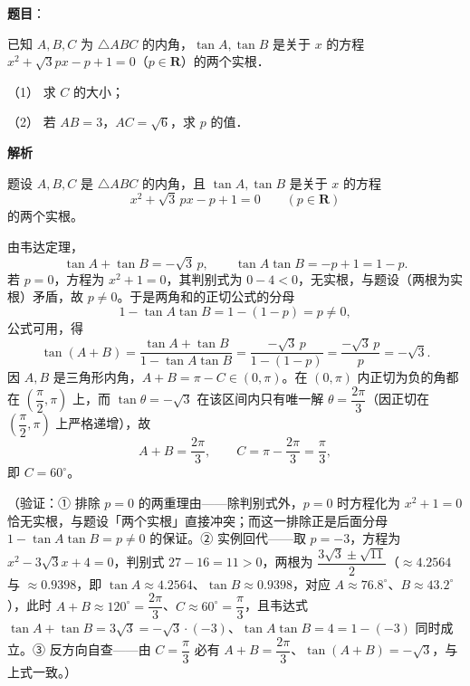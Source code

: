\begin{answer}

\textbf{题目}：

已知 \(A,B,C\) 为 \(\triangle ABC\) 的内角，\(\tan A,\tan B\) 是关于 \(x\) 的方程 \(x^2+\sqrt{3}px-p+1=0\)（\(p\in\mathbf{R}\)）的两个实根．

（1） 求 \(C\) 的大小；

（2） 若 \(AB=3\)，\(AC=\sqrt{6}\)，求 \(p\) 的值．

\textbf{解析}

题设 \(A,B,C\) 是 \(\triangle ABC\) 的内角，且 \(\tan A,\tan B\) 是关于 \(x\) 的方程
\nopagebreak[4]
\[
x^{2}+\sqrt{3}\,px-p+1=0\qquad(p\in\mathbf{R})
\]
的两个实根。


由韦达定理，
\nopagebreak[4]
\[
\tan A+\tan B=-\sqrt{3}\,p,\qquad \tan A\tan B=-p+1=1-p .
\]
若 \(p=0\)，方程为 \(x^{2}+1=0\)，其判别式为 \(0-4<0\)，无实根，与题设（两根为实根）矛盾，故 \(p\neq0\)。于是两角和的正切公式的分母
\nopagebreak[4]
\[
1-\tan A\tan B=1-(1-p)=p\neq0,
\]
公式可用，得
\nopagebreak[4]
\[
\tan(A+B)=\frac{\tan A+\tan B}{1-\tan A\tan B}=\frac{-\sqrt{3}\,p}{1-(1-p)}=\frac{-\sqrt{3}\,p}{p}=-\sqrt{3}.
\]
因 \(A,B\) 是三角形内角，\(A+B=\pi-C\in(0,\pi)\)。在 \((0,\pi)\) 内正切为负的角都在 \(\left(\dfrac{\pi}{2},\pi\right)\) 上，而 \(\tan\theta=-\sqrt{3}\) 在该区间内只有唯一解 \(\theta=\dfrac{2\pi}{3}\)（因正切在 \(\left(\dfrac{\pi}{2},\pi\right)\) 上严格递增），故
\nopagebreak[4]
\[
A+B=\frac{2\pi}{3},\qquad C=\pi-\frac{2\pi}{3}=\frac{\pi}{3},
\]
即 \(C=60^{\circ}\)。

（验证：① 排除 \(p=0\) 的两重理由——除判别式外，\(p=0\) 时方程化为 \(x^{2}+1=0\) 恰无实根，与题设「两个实根」直接冲突；而这一排除正是后面分母 \(1-\tan A\tan B=p\neq0\) 的保证。② 实例回代——取 \(p=-3\)，方程为 \(x^{2}-3\sqrt{3}x+4=0\)，判别式 \(27-16=11>0\)，两根为 \(\dfrac{3\sqrt{3}\pm\sqrt{11}}{2}\)（\(\approx4.2564\) 与 \(\approx0.9398\)，即 \(\tan A\approx4.2564\)、\(\tan B\approx0.9398\)，对应 \(A\approx76.8^{\circ}\)、\(B\approx43.2^{\circ}\)），此时 \(A+B\approx120^{\circ}=\dfrac{2\pi}{3}\)、\(C\approx60^{\circ}=\dfrac{\pi}{3}\)，且韦达式 \(\tan A+\tan B=3\sqrt{3}=-\sqrt{3}\cdot(-3)\)、\(\tan A\tan B=4=1-(-3)\) 同时成立。③ 反方向自查——由 \(C=\dfrac{\pi}{3}\) 必有 \(A+B=\dfrac{2\pi}{3}\)、\(\tan(A+B)=-\sqrt{3}\)，与上式一致。）


\end{answer}
